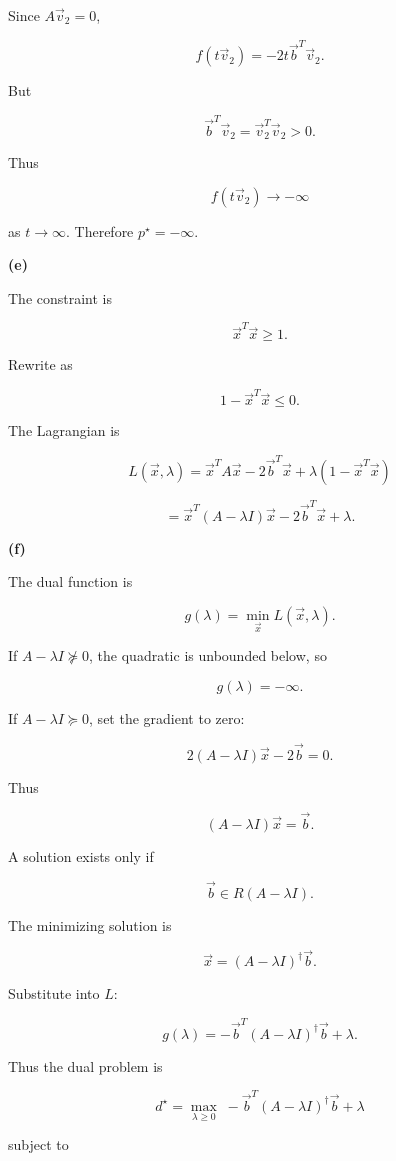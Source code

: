 \documentclass[
	12pt,
]{fphw}
\begin{document}
Since $A\vec{v}_2=0$,

\[
f(t\vec{v}_2) = -2t \vec{b}^T \vec{v}_2.
\]

But

\[
\vec{b}^T\vec{v}_2 = \vec{v}_2^T\vec{v}_2 >0.
\]

Thus

\[
f(t\vec{v}_2) \to -\infty
\]

as $t\to\infty$.
Therefore
$ p^\star = -\infty. $

\bigskip

\textbf{(e)}

The constraint is

\[
\vec{x}^T\vec{x} \ge 1.
\]

Rewrite as

\[
1-\vec{x}^T\vec{x} \le 0.
\]

The Lagrangian is

\[
L(\vec{x},\lambda)
=
\vec{x}^T A \vec{x}
-2\vec{b}^T\vec{x}
+\lambda(1-\vec{x}^T\vec{x})
\]

\[
=
\vec{x}^T(A-\lambda I)\vec{x}
-2\vec{b}^T\vec{x}
+\lambda.
\]

\bigskip

\textbf{(f)}

The dual function is

\[
g(\lambda)=\min_{\vec{x}} L(\vec{x},\lambda).
\]

If $A-\lambda I \not\succeq 0$, the quadratic is unbounded below, so

\[
g(\lambda)=-\infty.
\]

If $A-\lambda I\succeq0$, set the gradient to zero:

\[
2(A-\lambda I)\vec{x}-2\vec{b}=0.
\]

Thus

\[
(A-\lambda I)\vec{x}=\vec{b}.
\]

A solution exists only if

\[
\vec{b}\in R(A-\lambda I).
\]

The minimizing solution is

\[
\vec{x}=(A-\lambda I)^\dagger \vec{b}.
\]

Substitute into $L$:

\[
g(\lambda)
=
-\vec{b}^T (A-\lambda I)^\dagger \vec{b}
+\lambda.
\]

Thus the dual problem is

\[
d^\star =
\max_{\lambda\ge0}
\;
-\vec{b}^T (A-\lambda I)^\dagger \vec{b} + \lambda
\]

subject to
\end{document}
